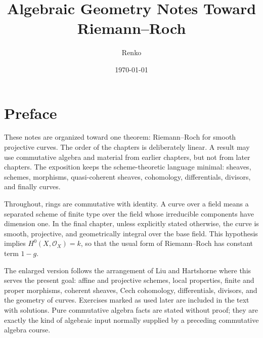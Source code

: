 \documentclass[12pt,openany]{book}
\title{Algebraic Geometry Notes Toward Riemann--Roch}
\author{Renko}
\date{\today}
\numberwithin{equation}{chapter}
\theoremstyle{definition}
\theoremstyle{plain}
\theoremstyle{remark}
\newcommand{\OO}{\mathcal{O}}
\begin{document}
\pagestyle{plain}
\maketitle
\tableofcontents

\chapter*{Preface}
These notes are organized toward one theorem: Riemann--Roch for smooth
projective curves.  The order of the chapters is deliberately linear.  A
result may use commutative algebra and material from earlier chapters, but not
from later chapters.  The exposition keeps the scheme-theoretic language
minimal: sheaves, schemes, morphisms, quasi-coherent sheaves, cohomology,
differentials, divisors, and finally curves.

Throughout, rings are commutative with identity.  A curve over a field means a
separated scheme of finite type over the field whose irreducible components
have dimension one.  In the final chapter, unless explicitly stated otherwise,
the curve is smooth, projective, and geometrically integral over the base
field.  This hypothesis implies \(H^0(X,\OO_X)=k\), so that the usual form of
Riemann--Roch has constant term \(1-g\).

The enlarged version follows the arrangement of Liu and Hartshorne where this
serves the present goal: affine and projective schemes, local properties,
finite and proper morphisms, coherent sheaves, Cech cohomology, differentials,
divisors, and the geometry of curves.  Exercises marked as used later are
included in the text with solutions.  Pure commutative algebra facts are stated
without proof; they are exactly the kind of algebraic input normally supplied
by a preceding commutative algebra course.









\end{document}
